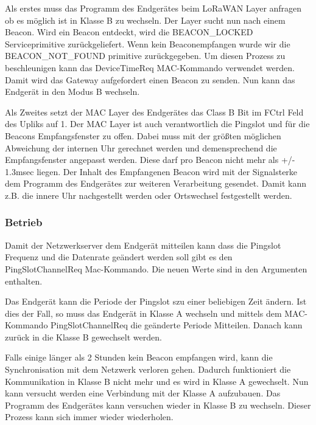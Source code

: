 \documentclass[a4paper,12pt]{article}
\begin{document}
                Als erstes muss das Programm des Endgerätes beim LoRaWAN Layer anfragen ob es möglich ist in Klasse B 
                zu wechseln. Der Layer sucht nun nach einem Beacon. Wird ein Beacon entdeckt, wird die BEACON\_LOCKED 
                Serviceprimitive  zurückgeliefert. Wenn kein Beaconempfangen wurde wir die 
                BEACON\_NOT\_FOUND primitive zurückgegeben. Um diesen Prozess zu beschleunigen kann das DeviceTimeReq 
                MAC-Kommando verwendet werden. Damit wird das Gateway aufgefordert einen Beacon zu senden. Nun kann 
                das Endgerät in den Modus B wechseln.

                Als Zweites setzt der MAC Layer des Endgerätes das Class B Bit im FCtrl Feld des Upliks auf 1. Der MAC 
                Layer ist auch verantwortlich die Pingslot und für die Beacons Empfangsfenster zu offen. Dabei muss mit 
                der größten möglichen Abweichung der internen Uhr gerechnet werden und demensprechend die 
                Empfangsfenster angepasst werden. Diese darf pro Beacon nicht mehr als +/- 1.3msec liegen. 
                \cite[S.73]{LoRaSpec}Der Inhalt des Empfangenen Beacon wird mit der Signalsterke dem Programm des 
                Endgerätes zur weiteren Verarbeitung gesendet. Damit kann z.B. die innere Uhr nachgestellt werden 
                oder Ortswechsel festgestellt werden.
            \subsubsection{Betrieb}
                Damit der Netzwerkserver dem Endgerät mitteilen kann dass die Pingslot Frequenz und die Datenrate 
                geändert werden soll gibt es den PingSlotChannelReq Mac-Kommando. Die neuen Werte sind in den 
                Argumenten enthalten.
                        
                Das Endgerät kann die Periode der Pingslot szu einer beliebigen Zeit ändern. Ist dies der Fall, so 
                muss das Endgerät in Klasse A wechseln und mittels dem MAC-Kommando PingSlotChannelReq die geänderte 
                Periode Mitteilen. Danach kann zurück in die Klasse B gewechselt werden.

                Falls einige länger als 2 Stunden kein Beacon empfangen wird, kann die Synchronisation mit dem Netzwerk 
                verloren gehen. Dadurch funktioniert die Kommunikation in Klasse B nicht mehr und es wird in Klasse A 
                gewechselt. Nun kann versucht werden eine Verbindung mit der Klasse A aufzubauen. Das Programm des 
                Endgerätes kann versuchen wieder in Klasse B zu wechseln. Dieser Prozess kann sich immer wieder 
                wiederholen.
\end{document}
